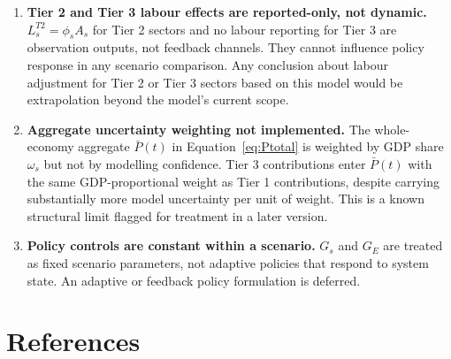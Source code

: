 \documentclass[11pt,a4paper]{article}
\begin{document}
\begin{enumerate}[label=\arabic*.]
  \item \textbf{Tier 2 and Tier 3 labour effects are reported-only, not dynamic.}
  $L_s^{T2} = \phi_s A_s$ for Tier 2 sectors and no labour reporting for Tier 3 are observation outputs, not feedback channels. They cannot influence policy response in any scenario comparison. Any conclusion about labour adjustment for Tier 2 or Tier 3 sectors based on this model would be extrapolation beyond the model's current scope.

  \item \textbf{Aggregate uncertainty weighting not implemented.}
  The whole-economy aggregate $\bar{P}(t)$ in Equation~\eqref{eq:Ptotal} is weighted by GDP share $\omega_s$ but not by modelling confidence. Tier 3 contributions enter $\bar{P}(t)$ with the same GDP-proportional weight as Tier 1 contributions, despite carrying substantially more model uncertainty per unit of weight. This is a known structural limit flagged for treatment in a later version.

  \item \textbf{Policy controls are constant within a scenario.}
  $G_s$ and $G_E$ are treated as fixed scenario parameters, not adaptive policies that respond to system state. An adaptive or feedback policy formulation is deferred.

\end{enumerate}

\section{References}
\end{document}
